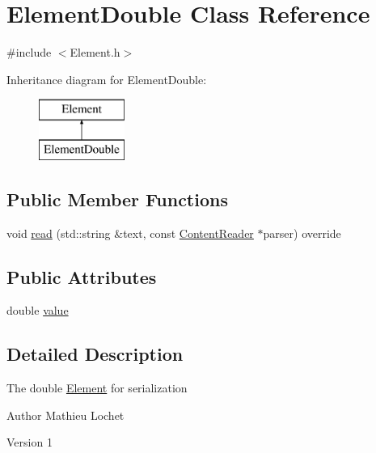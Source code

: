 \hypertarget{classElementDouble}{}\section{Element\+Double Class Reference}
\label{classElementDouble}


{\ttfamily \#include $<$Element.\+h$>$}

Inheritance diagram for Element\+Double\+:\begin{figure}[H]
\begin{center}
\leavevmode
\includegraphics[height=2.000000cm]{classElementDouble}
\end{center}
\end{figure}
\subsection*{Public Member Functions}
\begin{DoxyCompactItemize}
\item 
void \mbox{\hyperlink{classElementDouble_a11bf3651edd2cbcdf04610b113accf90}{read}} (std\+::string \&text, const \mbox{\hyperlink{classContentReader}{Content\+Reader}} $\ast$parser) override
\end{DoxyCompactItemize}
\subsection*{Public Attributes}
\begin{DoxyCompactItemize}
\item 
double \mbox{\hyperlink{classElementDouble_aa04fa64c846076944151db147bcaaa1f}{value}}
\end{DoxyCompactItemize}


\subsection{Detailed Description}
The double \mbox{\hyperlink{classElement}{Element}} for serialization

\begin{DoxyAuthor}{Author}
Mathieu Lochet 
\end{DoxyAuthor}
\begin{DoxyVersion}{Version}
1 
\end{DoxyVersion}


